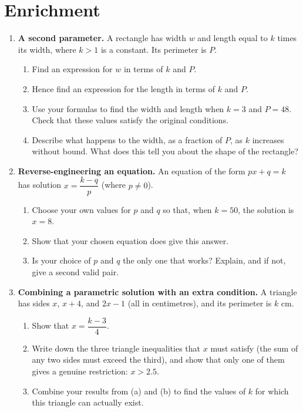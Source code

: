 \documentclass[11pt]{article}
\newcommand{\qspace}{\vspace{1.0cm}}
\begin{document}
\newpage
\section{Enrichment}

\begin{enumerate}
  \item \textbf{A second parameter.} A rectangle has width $w$ and length equal to $k$ times its width, where $k > 1$ is a constant. Its perimeter is $P$.
  \begin{enumerate}
    \item Find an expression for $w$ in terms of $k$ and $P$.
    \item Hence find an expression for the length in terms of $k$ and $P$.
    \item Use your formulas to find the width and length when $k = 3$ and $P = 48$. Check that these values satisfy the original conditions.
    \item Describe what happens to the width, as a fraction of $P$, as $k$ increases without bound. What does this tell you about the shape of the rectangle?
  \end{enumerate}
  \qspace

  \item \textbf{Reverse-engineering an equation.} An equation of the form $px + q = k$ has solution $x = \dfrac{k - q}{p}$ (where $p \neq 0$).
  \begin{enumerate}
    \item Choose your own values for $p$ and $q$ so that, when $k = 50$, the solution is $x = 8$.
    \item Show that your chosen equation does give this answer.
    \item Is your choice of $p$ and $q$ the only one that works? Explain, and if not, give a second valid pair.
  \end{enumerate}
  \qspace

  \item \textbf{Combining a parametric solution with an extra condition.} A triangle has sides $x$, $x + 4$, and $2x - 1$ (all in centimetres), and its perimeter is $k$ cm.
  \begin{enumerate}
    \item Show that $x = \dfrac{k - 3}{4}$.
    \item Write down the three triangle inequalities that $x$ must satisfy (the sum of any two sides must exceed the third), and show that only one of them gives a genuine restriction: $x > 2.5$.
    \item Combine your results from (a) and (b) to find the values of $k$ for which this triangle can actually exist.
  \end{enumerate}
  \qspace


\end{enumerate}
\end{document}
